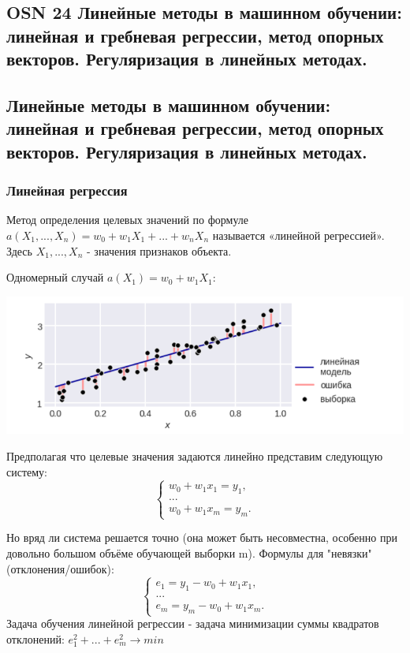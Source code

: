\subsection{OSN 24 Линейные методы в машинном обучении: линейная и гребневая регрессии, метод опорных векторов. Регуляризация в линейных методах.}

\subsection{Линейные методы в машинном обучении: линейная и гребневая регрессии, метод опорных векторов. Регуляризация в линейных методах.}
\subsubsection{Линейная регрессия}
Метод определения целевых значений по формуле $a(X_1, ..., X_n) = w_0 + w_1X_1 + ... + w_nX_n$ называется «линейной регрессией». Здесь $X_1, ..., X_n$ - значения признаков объекта.

Одномерный случай $a(X_1) = w_0 + w_1X_1$:

\includegraphics[scale=0.4]{pics/ml2_lin1.png}

Предполагая что целевые значения задаются линейно представим следующую систему:
\begin{equation*}
 \begin{cases}
   w_0 + w_1x_1 = y_1, 
   \\
   ...
   \\
   w_0 + w_1x_m = y_m.
 \end{cases}
\end{equation*}

Но вряд ли система решается точно (она может быть несовместна, особенно при довольно большом объёме обучающей выборки m).
Формулы для "невязки" (отклонения/ошибок):
\begin{equation*}
 \begin{cases}
   e_1 = y_1 - w_0 + w_1x_1, 
   \\
   ...
   \\
   e_m = y_m - w_0 + w_1x_m.
 \end{cases}
\end{equation*}
Задача обучения линейной регрессии - задача минимизации суммы квадратов
отклонений:
$e_1^2 + ... + e_m^2 \rightarrow min$

